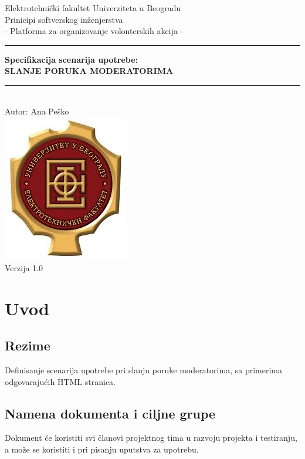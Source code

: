 \documentclass[11pt,a4paper]{article}
\begin{document}
\begin{titlepage}

\centering
\textnormal{\large Elektrotehnički fakultet Univerziteta u Beogradu}\\[0.1cm]
\textnormal{\large Prinicipi softverskog inženjerstva}\\[3cm]

\textnormal{\normalsize - Platforma za organizovanje volonterskih akcija -}\\\vspace{-5mm}
\rule{\textwidth}{0.4pt}
{\huge \bfseries Specifikacija scenarija upotrebe:\\ 
SLANJE PORUKA MODERATORIMA\par}\vspace{-1mm}
\rule{\textwidth}{0.4pt}\\\vspace{1mm}
\textnormal{\large Autor: Ana Peško}\\[6cm]

\includegraphics[scale=0.5]{logo.jpg}\\
\vfill
\textnormal{\normalsize Verzija 1.0}\\

\end{titlepage}

\tableofcontents

\newpage

\section{Uvod}
\subsection{Rezime}
Definisanje scenarija upotrebe pri slanju poruke moderatorima, sa primerima odgovarajućih HTML stranica.
\subsection{Namena dokumenta i ciljne grupe}
Dokument će koristiti svi članovi projektnog tima u razvoju projekta i testiranju, a može se koristiti i pri pisanju uputstva za upotrebu.
\end{document}
